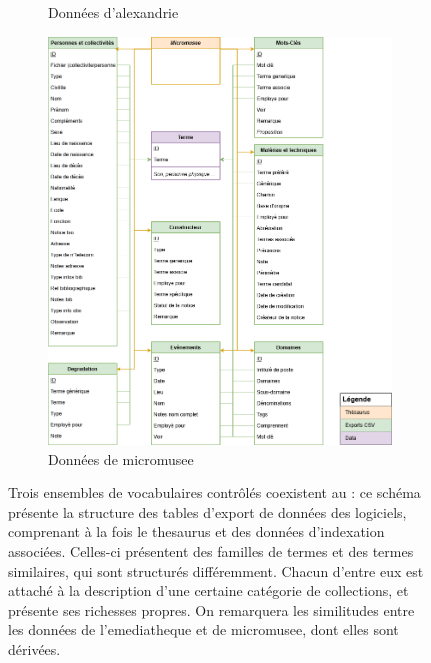 \begin{figure}[htbp]
\begin{subfigure}{0.45\textwidth}
		\caption{Données d'\gls{alexandrie}}
		\label{uml:alexandrie}
	\end{subfigure}
	\hfill
	\begin{subfigure}{0.5\textwidth}
		\centering
		\includegraphics[width=\linewidth]{img/UML_micromusee}
		\caption{Données de \gls{micromusee}}
		\label{uml:micromusee}
	\end{subfigure}
	\caption[Structure des \gls{thesaurus} du \mae]{Trois ensembles de vocabulaires contrôlés coexistent au \mae : ce schéma présente la structure des tables d'export de données des logiciels, comprenant à la fois le \gls{thesaurus} et des données d'indexation associées. Celles-ci présentent des familles de termes et des termes similaires, qui sont structurés différemment. Chacun d'entre eux est attaché à la description d'une certaine catégorie de collections, et présente ses richesses propres. On remarquera les similitudes entre les données de l'\gls{emediatheque} et de \gls{micromusee}, dont elles sont dérivées.}
	\label{fig:thesaurusmusee}
\end{figure}

